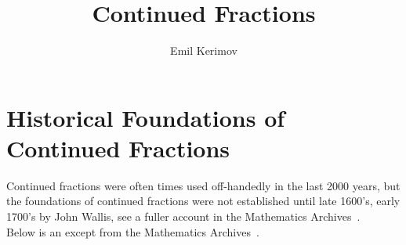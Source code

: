 \documentclass[a4paper]{article}
\title{Continued Fractions}
\author{Emil Kerimov}
\date{}
\begin{document}
\maketitle

\providecommand{\CFDots}{\genfrac{}{}{0pt}{0}{}{\ddots}}

\section{Historical Foundations of Continued Fractions}\label{cf:sec:history}
Continued fractions were often times used off-handedly in the last 2000 years, but the foundations of continued
fractions were not established until late 1600's, early 1700's by John Wallis, see a fuller account in the Mathematics
Archives~\cite{history_website}.
\\
Below is an except from the Mathematics Archives~\cite{history_website}.
\end{document}
